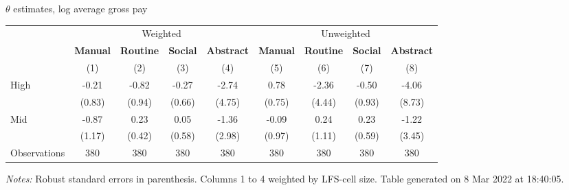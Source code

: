 \begin{center}
\begin{threeparttable}[!h]
\caption{$ \theta $ estimates, log average gross pay}
\begin{tabular}{lcccccccc}
\toprule
\toprule
& \multicolumn{4}{c}{Weighted} & \multicolumn{4}{c}{Unweighted} \\
&\multicolumn{1}{c}{\textbf{Manual}}&\multicolumn{1}{c}{\textbf{Routine}}&\multicolumn{1}{c}{\textbf{Social}}&\multicolumn{1}{c}{\textbf{Abstract}}&\multicolumn{1}{c}{\textbf{Manual}}&\multicolumn{1}{c}{\textbf{Routine}}&\multicolumn{1}{c}{\textbf{Social}}&\multicolumn{1}{c}{\textbf{Abstract}} \\
\textbf{}&\multicolumn{1}{c}{(1)}&\multicolumn{1}{c}{(2)}&\multicolumn{1}{c}{(3)}&\multicolumn{1}{c}{(4)}&\multicolumn{1}{c}{(5)}&\multicolumn{1}{c}{(6)}&\multicolumn{1}{c}{(7)}&\multicolumn{1}{c}{(8)} \\
\midrule
High                &       -0.21&       -0.82&       -0.27&       -2.74&        0.78&       -2.36&       -0.50&       -4.06\\
                    &      (0.83)&      (0.94)&      (0.66)&      (4.75)&      (0.75)&      (4.44)&      (0.93)&      (8.73)\\
Mid                 &       -0.87&        0.23&        0.05&       -1.36&       -0.09&        0.24&        0.23&       -1.22\\
                    &      (1.17)&      (0.42)&      (0.58)&      (2.98)&      (0.97)&      (1.11)&      (0.59)&      (3.45)\\
Observations        &         380&         380&         380&         380&         380&         380&         380&         380\\
\bottomrule
\bottomrule
\end{tabular}
\begin{tablenotes}
\item \footnotesize \textit{Notes:} Robust standard errors in parenthesis. Columns 1 to 4 weighted by LFS-cell size. Table generated on  8 Mar 2022 at 18:40:05.
\end{tablenotes}
\end{threeparttable}
\end{center}
